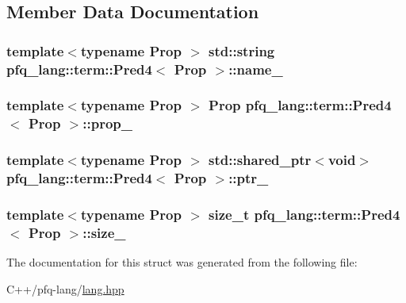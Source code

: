 \subsection{Member Data Documentation}
\hypertarget{structpfq__lang_1_1term_1_1Pred4_a57f3123042c7ab4bba88d975449624b5}{
\subsubsection[{name\-\_\-}]{\setlength{\rightskip}{0pt plus 5cm}template$<$typename Prop $>$ std\-::string {\bf pfq\-\_\-lang\-::term\-::\-Pred4}$<$ {\bf Prop} $>$\-::name\-\_\-}}\label{structpfq__lang_1_1term_1_1Pred4_a57f3123042c7ab4bba88d975449624b5}
\hypertarget{structpfq__lang_1_1term_1_1Pred4_ab5f3d36392d98a2549b8e517f8919163}{
\subsubsection[{prop\-\_\-}]{\setlength{\rightskip}{0pt plus 5cm}template$<$typename Prop $>$ {\bf Prop} {\bf pfq\-\_\-lang\-::term\-::\-Pred4}$<$ {\bf Prop} $>$\-::prop\-\_\-}}\label{structpfq__lang_1_1term_1_1Pred4_ab5f3d36392d98a2549b8e517f8919163}
\hypertarget{structpfq__lang_1_1term_1_1Pred4_abb2d1d1471c132aa44cb302ff97cb5d3}{
\subsubsection[{ptr\-\_\-}]{\setlength{\rightskip}{0pt plus 5cm}template$<$typename Prop $>$ std\-::shared\-\_\-ptr$<$void$>$ {\bf pfq\-\_\-lang\-::term\-::\-Pred4}$<$ {\bf Prop} $>$\-::ptr\-\_\-}}\label{structpfq__lang_1_1term_1_1Pred4_abb2d1d1471c132aa44cb302ff97cb5d3}
\hypertarget{structpfq__lang_1_1term_1_1Pred4_a8b048607b50bc442cf98b31987df7a53}{
\subsubsection[{size\-\_\-}]{\setlength{\rightskip}{0pt plus 5cm}template$<$typename Prop $>$ size\-\_\-t {\bf pfq\-\_\-lang\-::term\-::\-Pred4}$<$ {\bf Prop} $>$\-::size\-\_\-}}\label{structpfq__lang_1_1term_1_1Pred4_a8b048607b50bc442cf98b31987df7a53}


The documentation for this struct was generated from the following file\-:\begin{DoxyCompactItemize}
\item 
C++/pfq-\/lang/\hyperlink{lang_8hpp}{lang.\-hpp}\end{DoxyCompactItemize}
